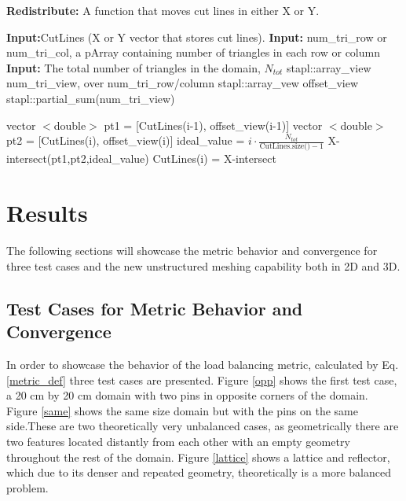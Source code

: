 \documentclass{anstrans}
\begin{document}


\begin{algorithm}
\textbf{Redistribute:} A function that moves cut lines in either X or Y. \\
\begin{algorithmic}
\STATE \textbf{Input:}CutLines (X or Y vector that stores cut lines). 
\STATE \textbf{Input:} num\_tri\_row or num\_tri\_col, a pArray containing number of triangles in each row or column 
\STATE \textbf{Input:} The total number of triangles in the domain, $N_{tot}$
\STATE stapl::array\_view num\_tri\_view, over num\_tri\_row/column
\STATE stapl::array\_vew offset\_view
\STATE stapl::partial\_sum(num\_tri\_view) 

	\STATE vector $<$double$>$ pt1 = [CutLines(i-1), offset\_view(i-1)]
	\STATE vector $<$double$>$ pt2 = [CutLines(i), offset\_view(i)]
	\STATE ideal\_value = $i\cdot \frac{N_{tot}}{\text{CutLines.size()}-1}$
	\STATE X-intersect(pt1,pt2,ideal\_value) 
	\STATE CutLines(i) = X-intersect
\ENDFOR
\end{algorithmic}
\end{algorithm}



\section{Results}
\label{ch:results}
The following sections will showcase the metric behavior and convergence for three test cases and the new unstructured meshing capability both in 2D and 3D.

\subsection{Test Cases for Metric Behavior and Convergence}
\label{sec:convergence}
In order to showcase the behavior of the load balancing metric, calculated by Eq. \ref{metric_def} three test cases are presented. Figure \ref{opp} shows the first test case, a 20 cm by 20 cm domain with two pins in opposite corners of the domain. Figure \ref{same} shows the same size domain but with the pins on the same side.These are two theoretically very unbalanced cases, as geometrically there are two features located distantly from each other with an empty geometry throughout the rest of the domain. Figure \ref{lattice} shows a lattice and reflector, which due to its denser and repeated geometry, theoretically is a more balanced problem. 
\end{document}
